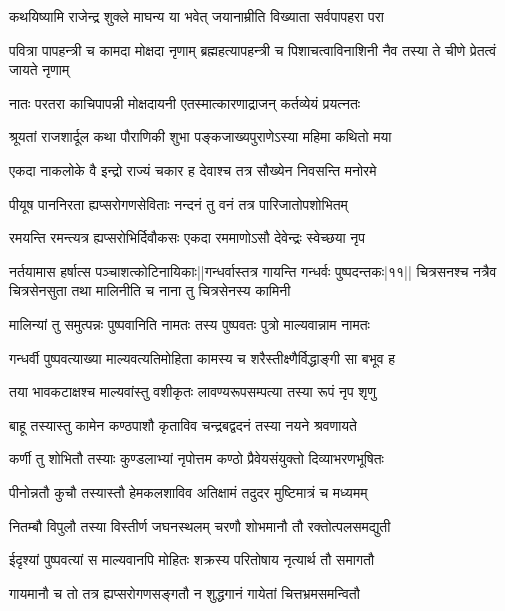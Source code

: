 
\twolineshloka
{कथयिष्यामि राजेन्द्र शुक्ले माघन्य या भवेत्}
{जयानाम्रीति विख्याता सर्वपापहरा परा} %


\threelineshloka
{पवित्रा पापहन्त्री च कामदा मोक्षदा नृणाम्}
{ब्रह्महत्यापहन्त्री च पिशाचत्वाविनाशिनी}
{नैव तस्या ते चीणे प्रेतत्वं जायते नृणाम्} %

\twolineshloka
{नातः परतरा काचिपापन्नी मोक्षदायनी}
{एतस्मात्कारणाद्राजन् कर्तव्येयं प्रयत्नतः} %

\twolineshloka
{श्रूयतां राजशार्दूल कथा पौराणिकी शुभा}
{पङ्कजाख्यपुराणेऽस्या महिमा कथितो मया} %

\twolineshloka
{एकदा नाकलोके वै इन्द्रो राज्यं चकार ह}
{देवाश्च तत्र सौख्येन निवसन्ति मनोरमे} %

\twolineshloka
{पीयूष पाननिरता ह्यप्सरोगणसेविताः}
{नन्दनं तु वनं तत्र पारिजातोपशोभितम्} %

\twolineshloka
{रमयन्ति रमन्त्यत्र ह्यप्सरोभिर्दिवौकसः}
{एकदा रममाणोऽसौ देवेन्द्रः स्वेच्छया नृप} %

\twolineshloka
{नर्तयामास हर्षात्स पञ्चाशत्कोटिनायिकाः||गन्धर्वास्तत्र गायन्ति गन्धर्वः पुष्पदन्तकः|११|| चित्रसनश्च नत्रैव चित्रसेनसुता तथा}
{मालिनीति च नाना तु चित्रसेनस्य कामिनी} %

\twolineshloka
{मालिन्यां तु समुत्पन्नः पुष्पवानिति नामतः}
{तस्य पुष्पवतः पुत्रो माल्यवान्नाम नामतः} %

\twolineshloka
{गन्धर्वी पुष्पवत्याख्या माल्यवत्यतिमोहिता}
{कामस्य च शरैस्तीक्ष्णैर्विद्धाङ्गी सा बभूव ह} %

\twolineshloka
{तया भावकटाक्षश्च माल्यवांस्तु वशीकृतः}
{लावण्यरूपसम्पत्या तस्या रूपं नृप शृणु} %

\twolineshloka
{बाहू तस्यास्तु कामेन कण्ठपाशौ कृताविव}
{चन्द्रबद्वदनं तस्या नयने श्रवणायते} %

\twolineshloka
{कर्णी तु शोभितौ तस्याः कुण्डलाभ्यां नृपोत्तम}
{कण्ठो प्रैवेयसंयुक्तो दिव्याभरणभूषितः} %

\twolineshloka
{पीनोन्नतौ कुचौ तस्यास्तौ हेमकलशाविव}
{अतिक्षामं तदुदर मुष्टिमात्रं च मध्यमम्} %

\twolineshloka
{नितम्बौ विपुलौ तस्या विस्तीर्ण जघनस्थलम्}
{चरणौ शोभमानौ तौ रक्तोत्पलसमद्युती} %

\twolineshloka
{ईदृश्यां पुष्पवत्यां स माल्यवानपि मोहितः}
{शक्रस्य परितोषाय नृत्यार्थ तौ समागतौ} %

\twolineshloka
{गायमानौ च तो तत्र ह्यप्सरोगणसङ्गतौ}
{न शुद्धगानं गायेतां चित्तभ्रमसमन्वितौ} %

